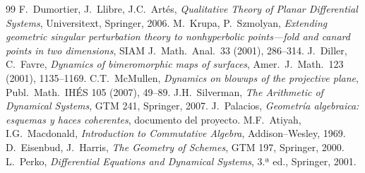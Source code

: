 \documentclass[11pt,a4paper,oneside]{book}
\theoremstyle{plain}
\theoremstyle{definition}
\theoremstyle{remark}
\begin{document}
\begin{thebibliography}{99}
 F.~Dumortier, J.~Llibre, J.C.~Artés, \emph{Qualitative Theory of Planar Differential Systems}, Universitext, Springer, 2006.
 M.~Krupa, P.~Szmolyan, \emph{Extending geometric singular perturbation theory to nonhyperbolic points---fold and canard points in two dimensions}, SIAM J.\ Math.\ Anal.\ 33 (2001), 286--314.
 J.~Diller, C.~Favre, \emph{Dynamics of bimeromorphic maps of surfaces}, Amer.\ J.\ Math.\ 123 (2001), 1135--1169.
 C.T.~McMullen, \emph{Dynamics on blowups of the projective plane}, Publ.\ Math.\ IHÉS 105 (2007), 49--89.
 J.H.~Silverman, \emph{The Arithmetic of Dynamical Systems}, GTM 241, Springer, 2007.
 J.~Palacios, \emph{Geometría algebraica: esquemas y haces coherentes}, documento del proyecto.
 M.F.~Atiyah, I.G.~Macdonald, \emph{Introduction to Commutative Algebra}, Addison--Wesley, 1969.
 D.~Eisenbud, J.~Harris, \emph{The Geometry of Schemes}, GTM 197, Springer, 2000.
 L.~Perko, \emph{Differential Equations and Dynamical Systems}, 3.ª ed., Springer, 2001.
\end{thebibliography}
\end{document}
